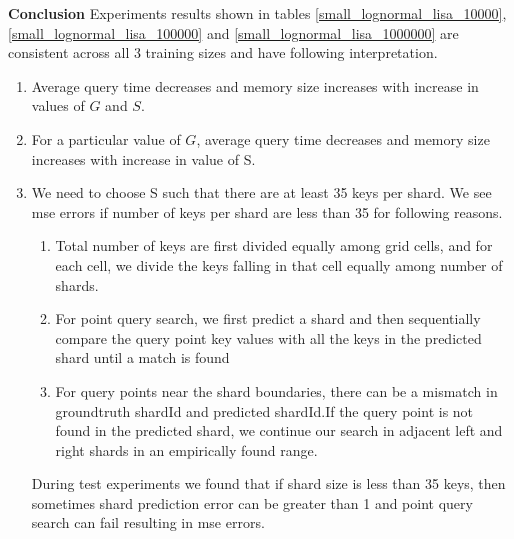 \textbf{Conclusion} Experiments results shown in tables \ref{small_lognormal_lisa_10000}, \ref{small_lognormal_lisa_100000} and \ref{small_lognormal_lisa_1000000} are consistent across all 3 training sizes and have following interpretation. 
\begin{enumerate}
    \item Average query time decreases and memory size increases with increase in values of $G$ and $S$. 
	\item For a particular value of $G$, average query time decreases and memory size increases with increase in value of S.
	\item We need to choose S such that there are at least 35 keys per shard. We see mse errors if number of keys per shard are less than 35 for following reasons. 
	\begin{enumerate}
	    \item Total number of keys are first divided equally among grid cells, and for each cell, we divide the keys falling in that cell equally among number of shards.
	    \item For point query search, we first predict a shard and then sequentially compare the query point key values with all the keys in the predicted shard until a match is found
		\item For query points near the shard boundaries, there can be a mismatch in groundtruth shardId and predicted shardId.If the query point is not found in the predicted shard, we continue our search in adjacent left and right shards in an empirically found range.
	\end{enumerate}
	
	During test experiments we found that if shard size is less than 35 keys, then sometimes shard prediction error can be greater than 1 and point query search can fail resulting in mse errors.  
\end{enumerate}

